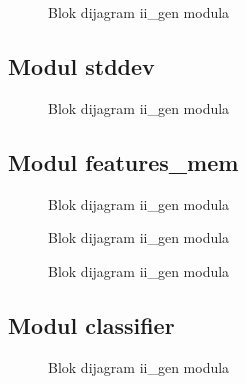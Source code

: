 \begin{figure}[H]
  \centering
  \scalebox{1.0}{
    
    }
\caption{Blok dijagram ii\_gen modula}
\label{ii_gen}
\end{figure}

\subsection{Modul stddev}

\begin{figure}[H]
  \centering
  \scalebox{0.9}{
    
    }
\caption{Blok dijagram ii\_gen modula}
\label{ii_gen}
\end{figure}

\subsection{Modul features\_mem}

\begin{figure}[H]
  \centering
    
\caption{Blok dijagram ii\_gen modula}
\label{ii_gen}
\end{figure}

\begin{figure}[H]
  \centering
  \scalebox{0.8}{
    
    }
\caption{Blok dijagram ii\_gen modula}
\label{ii_gen}
\end{figure}

\begin{figure}[H]
  \centering
  \scalebox{0.8}{
    
    }
\caption{Blok dijagram ii\_gen modula}
\label{ii_gen}
\end{figure}

\subsection{Modul classifier}


\begin{figure}[H]
  \centering
  \scalebox{0.80}{
    
    }
\caption{Blok dijagram ii\_gen modula}
\label{ii_gen}
\end{figure}